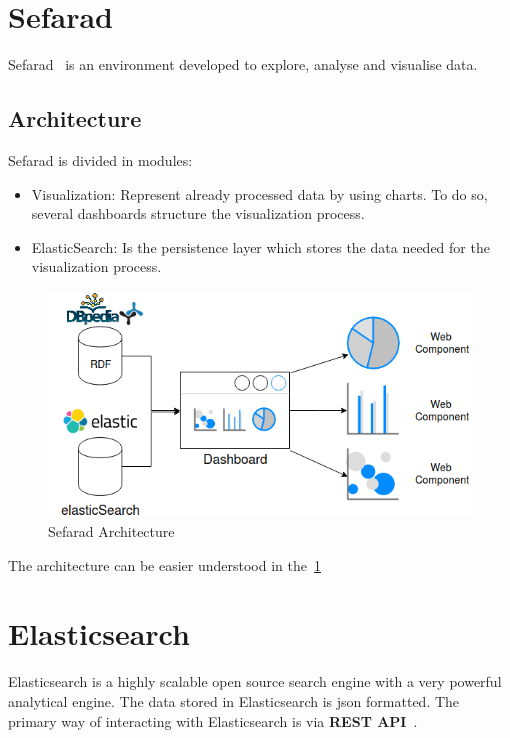 \section{Sefarad}
Sefarad~\cite{sefarad} is an environment developed to explore, analyse and visualise data. 
\subsection{Architecture}
Sefarad is divided in modules:
\begin{itemize}
	\item Visualization: Represent already processed data by using charts. To do so, several dashboards structure the visualization process.
	\item ElasticSearch: Is the persistence layer which stores the data needed for the visualization process.
\end{itemize}
\begin{figure}
	\includegraphics[width=\linewidth]{img/sefarad_architecture.png}
	\caption{Sefarad Architecture~\cite{sefarad}}
	\label{fig:sefaradarch}
\end{figure}
The architecture can be easier understood in the~\cref{fig:sefaradarch}
\section{Elasticsearch}
Elasticsearch is a highly scalable open source search engine with a very powerful analytical engine. The data stored in Elasticsearch is \ac{json} formatted. The primary way of interacting with Elasticsearch is via \textbf{REST API}~\cite{elastic1}.
